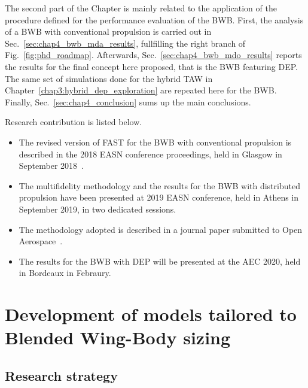 The second part of the Chapter is mainly related to the application of the procedure defined for the performance evaluation of the BWB. 
First, the analysis of a BWB with conventional propulsion is carried out in Sec.~\ref{sec:chap4_bwb_mda_results}, fullfilling the right branch of Fig.~\ref{fig:phd_roadmap}. 
Afterwards, Sec.~\ref{sec:chap4_bwb_mdo_results} reports the results for the final concept here proposed, that is the BWB featuring DEP. 
The same set of simulations done for the hybrid TAW in Chapter~\ref{chap3:hybrid_dep_exploration} are repeated here for the BWB. 
Finally, Sec.~\ref{sec:chap4_conclusion} sums up the main conclusions. 

Research contribution is listed below.
\begin{itemize}
	
	\item The revised version of FAST for the BWB with conventional propulsion is described in the 2018 EASN conference proceedings, held in Glasgow in September 2018~\cite{bib:sgueglia_bwb}.
	
	\item The multifidelity methodology and the results for the BWB with distributed propulsion have been presented at 2019 EASN conference, held in Athens in September 2019, in two dedicated sessions. 
	
	\item The methodology adopted is described in a journal paper submitted to Open Aerospace~\cite{bib:sgueglia_bwb_2019}.
	
	\item The results for the BWB with DEP will be presented at the AEC 2020, held in Bordeaux in Febraury. 
	
\end{itemize}

\section{Development of models tailored to Blended Wing-Body sizing}
\label{sec:chap4_bwb_modeling}

\subsection{Research strategy}
\label{subsec:chap4_bwb_research_strategy}


